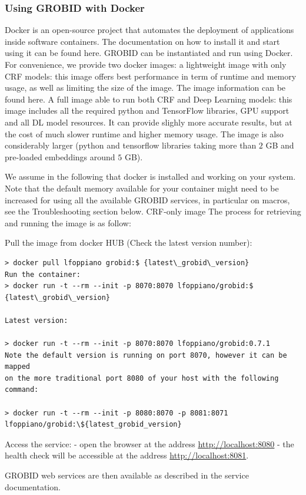 \documentclass[
10pt, %
a4paper, %
oneside, %
headinclude,footinclude, %
BCOR5mm, %
]{scrartcl}
\begin{document}
\subsubsection{Using GROBID with Docker}
Docker is an open-source project that automates the deployment of applications inside software containers. The documentation on how to install it and start using it can be found here.
GROBID can be instantiated and run using Docker. For convenience, we provide two docker images:
a lightweight image with only CRF models: this image offers best performance in term of runtime and memory usage, as well as limiting the size of the image. The image information can be found here.
A full image able to run both CRF and Deep Learning models: this image includes all the required python and TensorFlow libraries, GPU support and all DL model resources. It can provide slighly more accurate results, but at the cost of much slower runtime and higher memory usage. The image is also considerably larger (python and tensorflow libraries taking more than $2$ GB and pre-loaded embeddings around $5$ GB).

We assume in the following that docker is installed and working on your system. Note that the default memory available for your container might need to be increased for using all the available GROBID services, in particular on macros, see the Troubleshooting section below.
CRF-only image
The process for retrieving and running the image is as follow:

Pull the image from docker HUB (Check the latest version number):
\begin{verbatim}
> docker pull lfoppiano grobid:$ {latest\_grobid\_version}
Run the container:
> docker run -t --rm --init -p 8070:8070 lfoppiano/grobid:$ {latest\_grobid\_version}

Latest version:

> docker run -t --rm --init -p 8070:8070 lfoppiano/grobid:0.7.1
Note the default version is running on port 8070, however it can be mapped 
on the more traditional port 8080 of your host with the following command:

> docker run -t --rm --init -p 8080:8070 -p 8081:8071 
lfoppiano/grobid:\${latest_grobid_version}
\end{verbatim}
Access the service: - open the browser at the address \url{http://localhost:8080} - the health check will be accessible at the address \url{http://localhost:8081}.

GROBID web services are then available as described in the service documentation.
\end{document}
